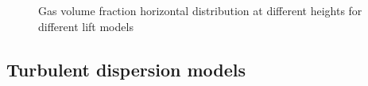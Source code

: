 \documentclass[11pt,a4paper]{article}
\begin{document}
\begin{figure}[H]
    \centering
    \caption[]{Gas volume fraction horizontal distribution at different heights for different lift models}
    \label{fig:alpha_lift}
\end{figure}

\subsection{Turbulent dispersion models}
\label{sub:turbulent_dispersion_models}
\end{document}
